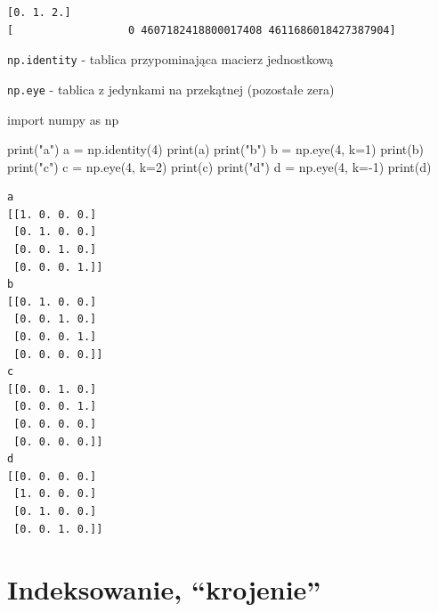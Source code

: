 \documentclass[
  polish,
  letterpaper,
  DIV=11,
  numbers=noendperiod]{scrreprt}
\newenvironment{Shaded}{\begin{snugshade}}{\end{snugshade}}
\newcommand{\BuiltInTok}[1]{\textcolor[rgb]{0.00,0.23,0.31}{#1}}
\newcommand{\DecValTok}[1]{\textcolor[rgb]{0.68,0.00,0.00}{#1}}
\newcommand{\ImportTok}[1]{\textcolor[rgb]{0.00,0.46,0.62}{#1}}
\newcommand{\NormalTok}[1]{\textcolor[rgb]{0.00,0.23,0.31}{#1}}
\newcommand{\OperatorTok}[1]{\textcolor[rgb]{0.37,0.37,0.37}{#1}}
\newcommand{\StringTok}[1]{\textcolor[rgb]{0.13,0.47,0.30}{#1}}
\begin{document}
\begin{verbatim}
[0. 1. 2.]
[                  0 4607182418800017408 4611686018427387904]
\end{verbatim}

\texttt{np.identity} - tablica przypominająca macierz jednostkową

\texttt{np.eye} - tablica z jedynkami na przekątnej (pozostałe zera)

\begin{Shaded}
\begin{Highlighting}[]
\ImportTok{import}\NormalTok{ numpy }\ImportTok{as}\NormalTok{ np}

\BuiltInTok{print}\NormalTok{(}\StringTok{"a"}\NormalTok{)}
\NormalTok{a }\OperatorTok{=}\NormalTok{ np.identity(}\DecValTok{4}\NormalTok{)}
\BuiltInTok{print}\NormalTok{(a)}
\BuiltInTok{print}\NormalTok{(}\StringTok{"b"}\NormalTok{)}
\NormalTok{b }\OperatorTok{=}\NormalTok{ np.eye(}\DecValTok{4}\NormalTok{, k}\OperatorTok{=}\DecValTok{1}\NormalTok{)}
\BuiltInTok{print}\NormalTok{(b)}
\BuiltInTok{print}\NormalTok{(}\StringTok{"c"}\NormalTok{)}
\NormalTok{c }\OperatorTok{=}\NormalTok{ np.eye(}\DecValTok{4}\NormalTok{, k}\OperatorTok{=}\DecValTok{2}\NormalTok{)}
\BuiltInTok{print}\NormalTok{(c)}
\BuiltInTok{print}\NormalTok{(}\StringTok{"d"}\NormalTok{)}
\NormalTok{d }\OperatorTok{=}\NormalTok{ np.eye(}\DecValTok{4}\NormalTok{, k}\OperatorTok{={-}}\DecValTok{1}\NormalTok{)}
\BuiltInTok{print}\NormalTok{(d)}
\end{Highlighting}
\end{Shaded}

\begin{verbatim}
a
[[1. 0. 0. 0.]
 [0. 1. 0. 0.]
 [0. 0. 1. 0.]
 [0. 0. 0. 1.]]
b
[[0. 1. 0. 0.]
 [0. 0. 1. 0.]
 [0. 0. 0. 1.]
 [0. 0. 0. 0.]]
c
[[0. 0. 1. 0.]
 [0. 0. 0. 1.]
 [0. 0. 0. 0.]
 [0. 0. 0. 0.]]
d
[[0. 0. 0. 0.]
 [1. 0. 0. 0.]
 [0. 1. 0. 0.]
 [0. 0. 1. 0.]]
\end{verbatim}

\chapter{Indeksowanie, ``krojenie''}\label{indeksowanie-krojenie}
\end{document}
